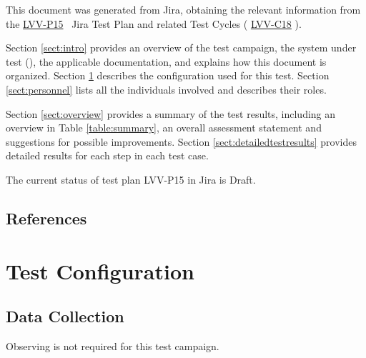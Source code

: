 \documentclass[DM,lsstdraft,STR,toc]{lsstdoc}
\begin{document}
This document was generated from Jira, obtaining the relevant information from the 
\href{https://jira.lsstcorp.org/secure/Tests.jspa#/testPlan/LVV-P15}{LVV-P15}
~Jira Test Plan and related Test Cycles (
  \href{https://jira.lsstcorp.org/secure/Tests.jspa#/testCycle/LVV-C18}{LVV-C18}
).


Section \ref{sect:intro} provides an overview of the test campaign, the system under test (\product{}), the applicable documentation, and explains how this document is organized.
Section \ref{sect:configuration}  describes the configuration used for this test.
Section \ref{sect:personnel} lists all the individuals involved and describes their roles.

Section \ref{sect:overview} provides a summary of the test results, including an overview in Table \ref{table:summary}, an overall assessment statement and suggestions for possible improvements.
Section \ref{sect:detailedtestresults} provides detailed results for each step in each test case.

The current status of test plan LVV-P15 in Jira is Draft.

\subsection{References}
\label{sect:references}
\renewcommand{\refname}{}

\section{Test Configuration}
\label{sect:configuration}

\subsection{Data Collection}

  Observing is not required for this test campaign.
\end{document}
